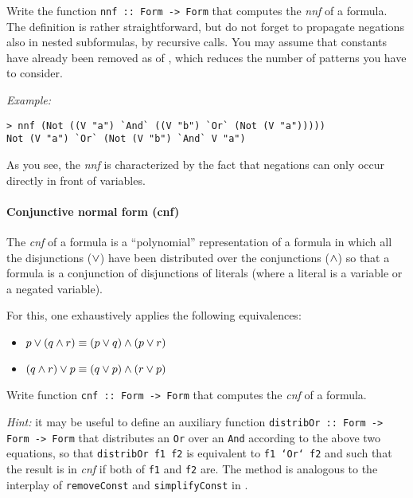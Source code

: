 \documentclass[english]{article}
\begin{document}
\begin{exo}\label{exo:nnf}
  Write the function \texttt{nnf :: Form -> Form} that computes the \emph{nnf}
  of a formula. The definition is rather straightforward, but do not forget to
  propagate negations also in nested subformulas, by recursive calls. You may
  assume that constants have already been removed as of
  , which reduces the number of patterns you have to
  consider.
\end{exo}

\noindent
\emph{Example:}
\begin{lstlisting}
> nnf (Not ((V "a") `And` ((V "b") `Or` (Not (V "a")))))
Not (V "a") `Or` (Not (V "b") `And` V "a")
\end{lstlisting}
As you see, the \emph{nnf} is characterized by the fact that negations can
only occur directly in front of variables.


\paragraph{Conjunctive normal form (cnf)} The \emph{cnf} of a formula is a
``polynomial'' representation of a formula in which all the disjunctions
($\lor$) have been distributed over the conjunctions ($\land$) so that a formula
is a conjunction of disjunctions of literals (where a literal is a variable or
a negated variable).

For this, one exhaustively applies the following equivalences:
\begin{itemize}
\item $p \lor (q \land r) \equiv (p \lor q) \land (p \lor r)$
\item $(q \land r) \lor p  \equiv (q \lor p) \land (r \lor p)$
\end{itemize}

\begin{exo}\label{exo:cnf}
Write function \texttt{cnf :: Form -> Form} that computes the \emph{cnf} of a
formula.

\emph{Hint:} it may be useful to define an auxiliary function
\texttt{distribOr :: Form -> Form -> Form} that distributes an \texttt{Or} over an \texttt{And}
according to the above two equations, so that \texttt{distribOr f1 f2} is
equivalent to \texttt{f1 `Or` f2} and such that the result is in \emph{cnf} if
both of \texttt{f1} and \texttt{f2} are. The method is analogous to the
interplay of \texttt{removeConst} and \texttt{simplifyConst} in .
\end{exo}
\end{document}
